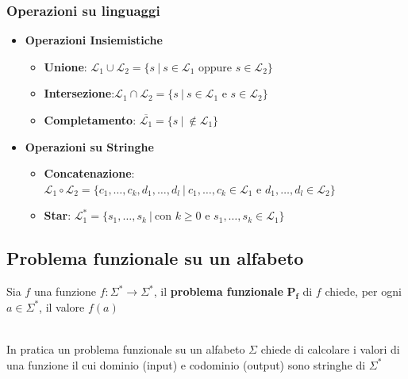 \subsubsection{Operazioni su linguaggi}
\begin{itemize}
   \item \textbf{Operazioni Insiemistiche}
   \begin{itemize}
      \item \textbf{Unione}: $\mathcal{L}_1 \cup \mathcal{L}_2 = \{ s \ |\  s \in \mathcal{L}_1 \text{ oppure }
      s \in \mathcal{L}_2 \}$
      \item \textbf{Intersezione}:$\mathcal{L}_1 \cap \mathcal{L}_2 = \{ s \ |\  s \in \mathcal{L}_1 \text{ e }
      s \in \mathcal{L}_2 \}$
      \item \textbf{Completamento}: $\overline{\mathcal{L}_1} = \{ s \ | \ \notin \mathcal{L}_1  \}$ 
   \end{itemize}
   \item \textbf{Operazioni su Stringhe}
   \begin{itemize}
      \item \textbf{Concatenazione}: $\mathcal{L}_1  \circ \mathcal{L_2} = \{c_1,\dots,c_k,d_1,\dots,d_l   
      \ | \  c_1,\dots,c_k \in \mathcal{L}_1 \text{ e }  d_1,\dots,d_l \in \mathcal{L}_2 \}$
      \item \textbf{Star}: $\mathcal{L}_1^* = \{   s_1,\dots,s_k \ | \ \text{con } k \ge 0 \text{ e }  s_1,\dots,s_k \in \mathcal{L}_1 \}$
   \end{itemize}
\end{itemize}





\subsection{Problema funzionale su un alfabeto}
\colorbox{SALZO}{\parbox{\dimexpr\linewidth-2\fboxsep}{\begin{definition}
   Sia $f$ una funzione $f: \Sigma^* \to \Sigma^*$, il \textbf{problema funzionale} $\bm{P_f}$ di $f$ chiede, per ogni $a \in \Sigma^*$, il valore $f(a)$ 
\end{definition}}}\smallskip\\
In pratica un problema funzionale su un alfabeto $\Sigma$ chiede di calcolare i valori di una funzione il cui dominio (input) e codominio (output) sono stringhe di $\Sigma^*$





